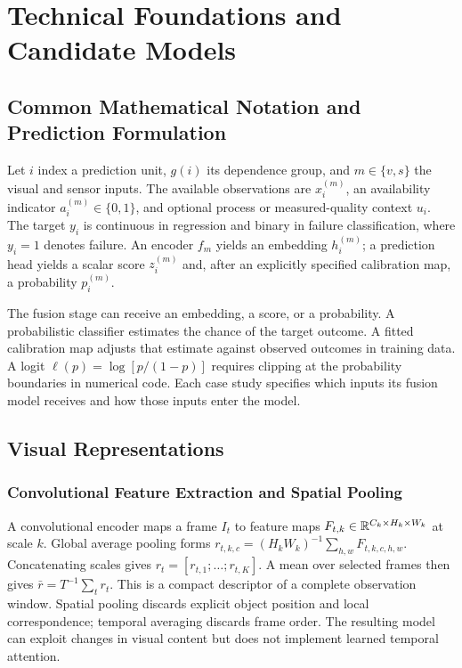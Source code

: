 \chapter{Technical Foundations and Candidate Models}
\label{ch:foundations}

\section{Common Mathematical Notation and Prediction Formulation}
Let $i$ index a prediction unit, $g(i)$ its dependence group, and $m\in\{v,s\}$ the visual and sensor inputs. The available observations are $x_i^{(m)}$, an availability indicator $a_i^{(m)}\in\{0,1\}$, and optional process or measured-quality context $u_i$. The target $y_i$ is continuous in regression and binary in failure classification, where $y_i=1$ denotes failure. An encoder $f_m$ yields an embedding $h_i^{(m)}$; a prediction head yields a scalar score $z_i^{(m)}$ and, after an explicitly specified calibration map, a probability $p_i^{(m)}$.

The fusion stage can receive an embedding, a score, or a probability. A probabilistic classifier estimates the chance of the target outcome. A fitted calibration map adjusts that estimate against observed outcomes in training data. A logit $\ell(p)=\log[p/(1-p)]$ requires clipping at the probability boundaries in numerical code. Each case study specifies which inputs its fusion model receives and how those inputs enter the model.

\section{Visual Representations}
\subsection{Convolutional Feature Extraction and Spatial Pooling}
A convolutional encoder maps a frame $I_t$ to feature maps $F_{t,k}\in\mathbb{R}^{C_k\times H_k\times W_k}$ at scale $k$. Global average pooling forms $r_{t,k,c}=(H_kW_k)^{-1}\sum_{h,w}F_{t,k,c,h,w}$. Concatenating scales gives $r_t=[r_{t,1};\ldots;r_{t,K}]$. A mean over selected frames then gives $\bar r=T^{-1}\sum_t r_t$. This is a compact descriptor of a complete observation window. Spatial pooling discards explicit object position and local correspondence; temporal averaging discards frame order. The resulting model can exploit changes in visual content but does not implement learned temporal attention.

